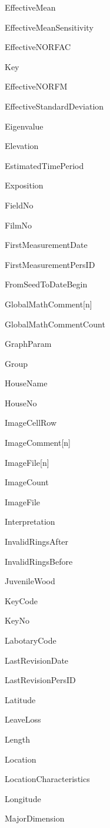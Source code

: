 \begin{multicols}{2}
\begin{itemize*}
 \item  EffectiveMean
 \item  EffectiveMeanSensitivity
 \item  EffectiveNORFAC
 \item  Key
 \item  EffectiveNORFM
 \item  EffectiveStandardDeviation
 \item  Eigenvalue
 \item  Elevation
 \item  EstimatedTimePeriod
 \item  Exposition
 \item  FieldNo
 \item  FilmNo
 \item  FirstMeasurementDate
 \item  FirstMeasurementPersID
 \item  FromSeedToDateBegin
 \item  GlobalMathComment[n]
 \item  GlobalMathCommentCount
 \item  GraphParam
 \item  Group
 \item  HouseName
 \item  HouseNo
 \item  ImageCellRow
 \item  ImageComment[n]
 \item  ImageFile[n]
 \item  ImageCount
 \item  ImageFile
 \item  Interpretation
 \item  InvalidRingsAfter
 \item  InvalidRingsBefore
 \item  JuvenileWood
 \item  KeyCode
 \item  KeyNo
 \item  LabotaryCode
 \item  LastRevisionDate
 \item  LastRevisionPersID
 \item  Latitude
 \item  LeaveLoss
 \item  Length
 \item  Location
 \item  LocationCharacteristics
 \item  Longitude
 \item  MajorDimension

\end{itemize*}
\end{multicols}
